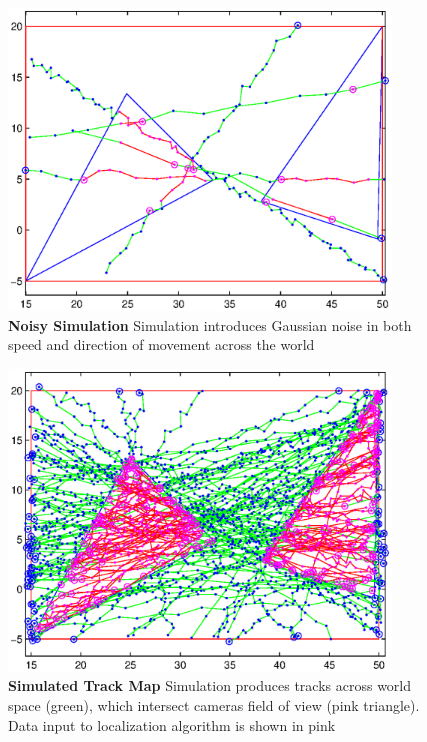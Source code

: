 \documentclass[journal]{IEEEtran}
\begin{document}
	\begin{figure}
		\centering
		\includegraphics[width=4in]{./curvy_paths.eps}
		\caption{\textbf{Noisy Simulation} Simulation introduces Gaussian noise in both 											speed and direction of movement across the 											world}
		\label{curvy_paths}
	\end{figure}

	\begin{figure}
		\centering
		\includegraphics[width=4in]{./paths.eps}
		\caption{\textbf{Simulated Track Map}  Simulation produces tracks across world 
										space (green), which intersect cameras 
										field of view (pink triangle). Data input to
										localization algorithm is shown in pink}
		\label{paths}
	\end{figure}
\end{document}
